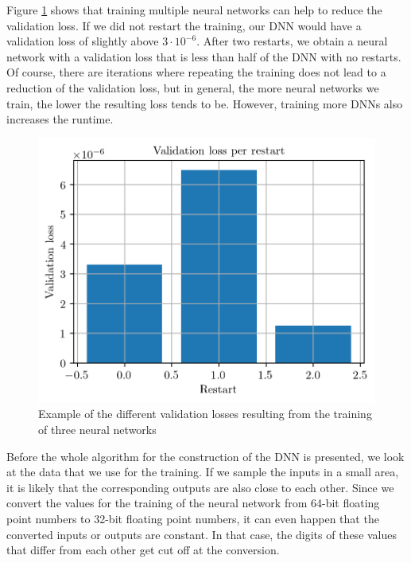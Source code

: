 Figure \ref{DNNRestartsPlot} shows that training multiple neural networks can help to reduce the validation loss. If we did not restart the training, our DNN would have a validation loss of slightly above $3\cdot10^{-6}$. After two restarts, we obtain a neural network with a validation loss that is less than half of the DNN with no restarts. Of course, there are iterations where repeating the training does not lead to a reduction of the validation loss, but in general, the more neural networks we train, the lower the resulting loss tends to be. However, training more DNNs also increases the runtime.\\

\begin{figure}
\centering
\includegraphics{Plots/DNNRestarts.png}
\caption{\label{DNNRestartsPlot}Example of the different validation losses resulting from the training of three neural networks}
\end{figure}

Before the whole algorithm for the construction of the DNN is presented, we look at the data that we use for the training. If we sample the inputs in a small area, it is likely that the corresponding outputs are also close to each other. Since we convert the values for the training of the neural network from 64-bit floating point numbers to 32-bit floating point numbers, it can even happen that the converted inputs or outputs are constant. In that case, the digits of these values that differ from each other get cut off at the conversion.

